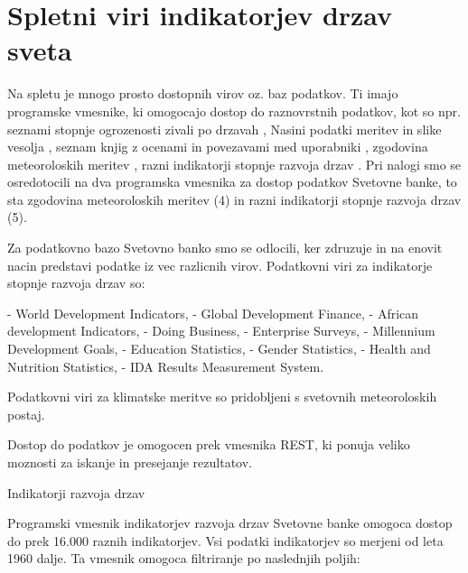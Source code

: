 \chapter{Spletni viri indikatorjev drzav sveta}

Na spletu je mnogo prosto dostopnih virov oz. baz podatkov. Ti imajo programske
vmesnike, ki omogocajo dostop do raznovrstnih podatkov, kot so npr. seznami 
stopnje ogrozenosti zivali po drzavah 
,
Nasini podatki meritev in slike vesolja
,
seznam knjig z ocenami in povezavami med uporabniki
,
zgodovina meteoroloskih meritev
,
razni indikatorji stopnje razvoja drzav
.
Pri nalogi smo se osredotocili na dva programska vmesnika za dostop podatkov 
Svetovne banke, to sta zgodovina meteoroloskih meritev (4) in razni 
indikatorji stopnje razvoja drzav (5).


% 
% 
% 
% 


Za podatkovno bazo Svetovno banko smo se odlocili, ker zdruzuje in na enovit
nacin predstavi podatke iz vec razlicnih virov. Podatkovni viri za indikatorje
stopnje razvoja drzav so:

- World Development Indicators, 
- Global Development Finance, 
- African development Indicators, 
- Doing Business,
- Enterprise Surveys, 
- Millennium Development Goals, 
- Education Statistics, 
- Gender Statistics,
- Health and Nutrition Statistics, 
- IDA Results Measurement System.

Podatkovni viri za klimatske meritve so pridobljeni s svetovnih meteoroloskih 
postaj.


Dostop do podatkov je omogocen prek vmesnika REST, ki ponuja veliko moznosti 
za iskanje in presejanje rezultatov.





Indikatorji razvoja drzav

Programski vmesnik indikatorjev razvoja drzav Svetovne banke omogoca dostop
do prek 16.000 raznih indikatorjev. Vsi podatki indikatorjev so merjeni od leta
1960 dalje. Ta vmesnik omogoca filtriranje po naslednjih poljih:

